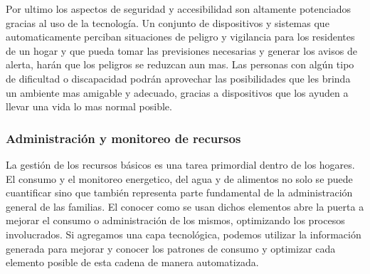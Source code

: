 Por ultimo los aspectos de seguridad y accesibilidad son altamente potenciados gracias al uso de la tecnología. Un conjunto de dispositivos y sistemas que automaticamente perciban situaciones de peligro y vigilancia para los residentes de un hogar y que pueda tomar las previsiones necesarias y generar los avisos de alerta, harán que los peligros se reduzcan aun mas. Las personas con algún tipo de dificultad o discapacidad podrán aprovechar las posibilidades que les brinda un ambiente mas amigable y adecuado, gracias a dispositivos que los ayuden a llevar una vida lo mas normal posible.

\subsubsection{Administración y monitoreo de recursos}
La gestión de los recursos básicos es una tarea primordial dentro de los hogares. El consumo y el monitoreo energetico, del agua y de alimentos no solo se puede cuantificar sino que también representa parte fundamental de la administración general de las familias. El conocer como se usan dichos elementos abre la puerta a mejorar el consumo o administración de los mismos, optimizando los procesos involucrados. Si agregamos una capa tecnológica, podemos utilizar la información generada para mejorar y conocer los patrones de consumo y optimizar cada elemento posible de esta cadena de manera automatizada.\\

